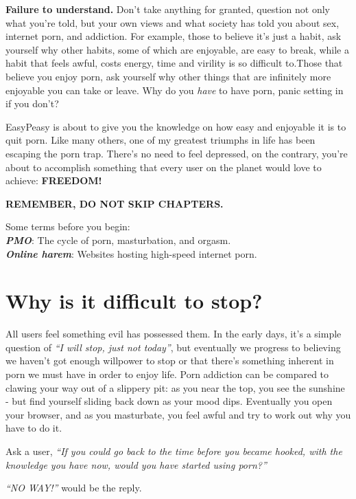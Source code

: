 \documentclass[
]{book}
\begin{document}
\textbf{Failure to understand.}
Don't take anything for granted, question not only what you're told, but your own views and what society has told you about sex, internet porn, and addiction. For example, those to believe it's just a habit, ask yourself why other habits, some of which are enjoyable, are easy to break, while a habit that feels awful, costs energy, time and virility is so difficult to.Those that believe you enjoy porn, ask yourself why other things that are infinitely more enjoyable you can take or leave. Why do you \emph{have} to have porn, panic setting in if you don't?

EasyPeasy is about to give you the knowledge on how easy and enjoyable it is to quit porn. Like many others, one of my greatest triumphs in life has been escaping the porn trap. There's no need to feel depressed, on the contrary, you're about to accomplish something that every user on the planet would love to achieve: \textbf{FREEDOM!}

\textbf{REMEMBER, DO NOT SKIP CHAPTERS.}

Some terms before you begin:\\
\textbf{\emph{PMO}}: The cycle of porn, masturbation, and orgasm.\\
\textbf{\emph{Online harem}}: Websites hosting high-speed internet porn.

\hypertarget{why-is-it-difficult-to-stop}{%
\chapter{Why is it difficult to stop?}\label{why-is-it-difficult-to-stop}}

All users feel something evil has possessed them. In the early days, it's a simple question of \emph{``I will stop, just not today''}, but eventually we progress to believing we haven't got enough willpower to stop or that there's something inherent in porn we must have in order to enjoy life. Porn addiction can be compared to clawing your way out of a slippery pit: as you near the top, you see the sunshine - but find yourself sliding back down as your mood dips. Eventually you open your browser, and as you masturbate, you feel awful and try to work out why you have to do it.

Ask a user, \emph{``If you could go back to the time before you became hooked, with the knowledge you have now, would you have started using porn?''}

\emph{``NO WAY!''} would be the reply.
\end{document}
